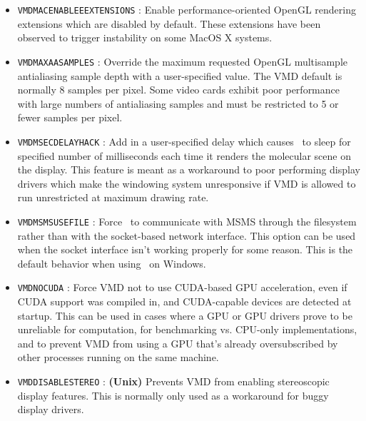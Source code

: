 \begin{itemize}
  \item {\tt VMDMACENABLEEEXTENSIONS} :
   Enable performance-oriented OpenGL rendering extensions
   which are disabled by default.  These extensions have been 
   observed to trigger instability on some MacOS X systems.

  \item {\tt VMDMAXAASAMPLES} :
   Override the maximum requested OpenGL multisample antialiasing
   sample depth with a user-specified value.  The VMD default is
   normally 8 samples per pixel.  Some video cards exhibit poor 
   performance with large numbers of antialiasing samples and must
   be restricted to 5 or fewer samples per pixel.

  \item {\tt VMDMSECDELAYHACK} :
   Add in a user-specified delay which causes \VMD\ to sleep for
   specified number of milliseconds each time it renders the molecular
   scene on the display.  This feature is meant as a workaround to 
   poor performing display drivers which make the windowing system
   unresponsive if VMD is allowed to run unrestricted at maximum drawing rate.

  \item {\tt VMDMSMSUSEFILE} :
   Force \VMD\ to communicate with MSMS through the filesystem rather
   than with the socket-based network interface.  This option can be
   used when the socket interface isn't working properly for some reason.
   This is the default behavior when using \VMD\ on Windows.

  \item {\tt VMDNOCUDA} :
   Force VMD not to use CUDA-based GPU acceleration, even if CUDA 
   support was compiled in, and CUDA-capable devices are detected at startup.
   This can be used in cases where a GPU or GPU drivers prove to be unreliable
   for computation, for benchmarking vs. CPU-only implementations, and
   to prevent VMD from using a GPU that's already oversubscribed by other
   processes running on the same machine.

  \item {\tt VMDDISABLESTEREO} :
   {\bf (Unix)}
   Prevents VMD from enabling stereoscopic display features.  This is
   normally only used as a workaround for buggy display drivers.


\end{itemize}
